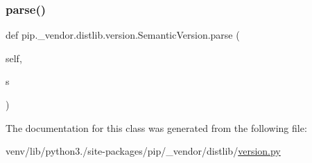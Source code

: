 \subsubsection{\texorpdfstring{parse()}{parse()}}
{\footnotesize\ttfamily def pip.\+\_\+vendor.\+distlib.\+version.\+Semantic\+Version.\+parse (\begin{DoxyParamCaption}\item[{}]{self,  }\item[{}]{s }\end{DoxyParamCaption})}



The documentation for this class was generated from the following file\+:\begin{DoxyCompactItemize}
\item 
venv/lib/python3./site-\/packages/pip/\+\_\+vendor/distlib/\hyperlink{pip_2__vendor_2distlib_2version_8py}{version.\+py}\end{DoxyCompactItemize}
